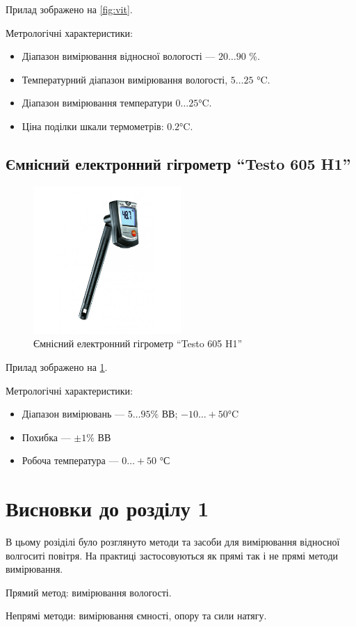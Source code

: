 Прилад зображено на \ref{fig:vit}.

Метрологічні характеристики:
\begin{itemize}
\item Діапазон вимірювання відносної вологості --- $20 \ldots 90$ \%.
\item Температурний діапазон вимірювання вологості,  $5 \ldots 25$ °C.
\item Діапазон вимірювання температури $0 \ldots 25$°C.
\item Ціна поділки шкали термометрів:  $0.2$°C.
\end{itemize}

\subsection{Ємнісний електронний гігрометр ``Testo 605 H1''}
\begin{figure}[!ht]
\centering
\includegraphics[width=0.5\textwidth]{./images/testo.jpg}
\caption{Ємнісний електронний гігрометр ``Testo 605 H1''}
\label{fig:testo}
\end{figure}

Прилад зображено на \ref{fig:testo}.

Метрологічні характеристики:
\begin{itemize}
\item Діапазон вимірювань --- $5 \ldots 95 \%$ ВВ;  $-10 \ldots +50$°C
\item Похибка --- $\pm 1\%$ ВВ
\item Робоча температура ---  $0 \ldots +50$ °С
\end{itemize}


\section*{Висновки до розділу 1}

В цьому розіділі було розглянуто методи та засоби для вимірювання відносної волгоситі повітря.
На практиці застосовуються як прямі так і не прямі методи вимірювання.

Прямий метод: вимірювання вологості.

Непрямі методи: вимірювання ємності, опору та сили натягу.
